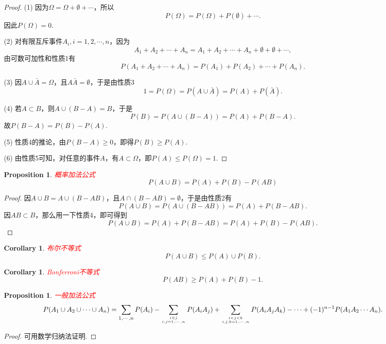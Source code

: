 \documentclass{article}
\newtheorem{corollary}[theorem]{Corollary}
\newtheorem{proposition}[theorem]{Proposition}
\newcommand{\redt}[1]{\textcolor{red}{#1}}
\begin{document}
\begin{proof}
(1) 因为$\Omega = \Omega + \emptyset + \cdots$，所以
$$
P(\Omega) = P(\Omega) + P(\emptyset) + \cdots.
$$
因此$P(\Omega) = 0$.

(2) 对有限互斥事件$A_i,i=1,2,\cdots,n$，因为
$$
A_1 + A_2 + \cdots + A_n = A_1 + A_2 + \cdots + A_n + \emptyset +\emptyset + \cdots,
$$
由可数可加性和性质1有
$$
P(A_1 + A_2 + \cdots + A_n) = P(A_1) + P(A_2) + \cdots + P(A_n). 
$$

(3)
因$A \cup \bar{A} = \Omega$，且$A\bar{A} = \emptyset$，于是由性质3
$$
1 = P(\Omega) = P(A \cup \bar{A}) = P(A) + P(\bar{A}).
$$

(4) 若$A \subset B$，则$A \cup (B-A) = B$，于是
$$
P(B) = P(A \cup (B-A)) = P(A) + P(B-A).
$$
故$P(B-A) = P(B) - P(A)$. 

(5) 性质4的推论，由$P(B-A) \geq 0$，即得$P(B) \geq P(A)$. 

(6) 由性质5可知，对任意的事件$A$，有$A \subset \Omega$，即$P(A) \leq P(\Omega) = 1$. 
\end{proof}

\begin{proposition}
\rm \redt{概率加法公式}
$$
P(A \cup B) = P(A) + P(B) - P(AB) 
$$
\end{proposition}

\begin{proof}
因$A \cup B = A \cup (B - AB)$，且$A \cap (B-AB) = \emptyset$，于是由性质2有
$$
P(A \cup B) = P(A \cup (B-AB)) = P(A) + P(B-AB).
$$
因$AB \subset B$，那么用一下性质4，即可得到
$$
P(A \cup B) = P(A) + P(B-AB) = P(A) + P(B) - P(AB).
$$
\end{proof}

\begin{corollary}
\rm \redt{布尔不等式}
$$
P(A \cup B) \leq P(A) \cup P(B).
$$
\end{corollary}

\begin{corollary}
\rm \redt{Bonferroni不等式}
$$
P(AB) \geq P(A) + P(B) -1.
$$
\end{corollary}

\begin{proposition}
\rm \redt{一般加法公式}
$$
P(A_1 \cup A_2 \cup \cdots \cup A_n) = \sum\limits_{1,\cdots,n} P(A_i) - \sum\limits_{i < j \atop i,j = 1,\cdots,n}P(A_iA_j) +  \sum\limits_{i < j < k \atop i,j,k = 1,\cdots,n}P(A_iA_jA_k) - \cdots + (-1)^{n-1}P(A_1A_2\cdots A_n). 
$$
\end{proposition}

\begin{proof}
可用数学归纳法证明. 
\end{proof}
\end{document}
